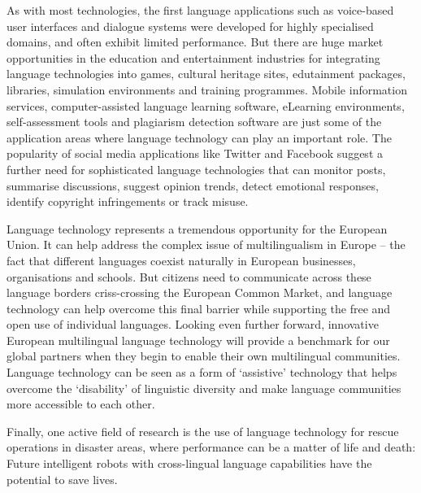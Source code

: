 \documentclass{../../metanetpaper}
\begin{document}
\begin{Parallel}[c]{79mm}{78mm}
{As with most technologies, the first language applications such as voice-based
user interfaces and dialogue systems were developed for highly specialised
domains, and often exhibit limited performance. But there are huge market
opportunities in the education and entertainment industries for integrating
language technologies into games, cultural heritage sites, edutainment
packages, libraries, simulation environments and training programmes. Mobile
information services, computer-assisted language learning software, eLearning
environments, self-assessment tools and plagiarism detection software are just
some of the application areas where language technology can play an important
role. The popularity of social media applications like Twitter and Facebook
suggest a further need for sophisticated language technologies that can monitor
posts, summarise discussions, suggest opinion trends, detect emotional
responses, identify copyright infringements or track misuse.


Language technology represents a tremendous opportunity for the European Union.
It can help address the complex issue of multilingualism in Europe – the fact
that different languages coexist naturally in European businesses,
organisations and schools. But citizens need to communicate across these
language borders criss-crossing the European Common Market, and language
technology can help overcome this final barrier while supporting the free and
open use of individual languages. Looking even further forward, innovative
European multilingual language technology will provide a benchmark for our
global partners when they begin to enable their own multilingual communities.
Language technology can be seen as a form of ‘assistive’ technology that helps
overcome the ‘disability’ of linguistic diversity and make language communities
more accessible to each other.

Finally, one active field of research is the use of language technology for
rescue operations in disaster areas, where performance can be a matter of life
and death: Future intelligent robots with cross-lingual language capabilities
have the potential to save lives.
}

\ParallelPar



\end{Parallel}
\end{document}
